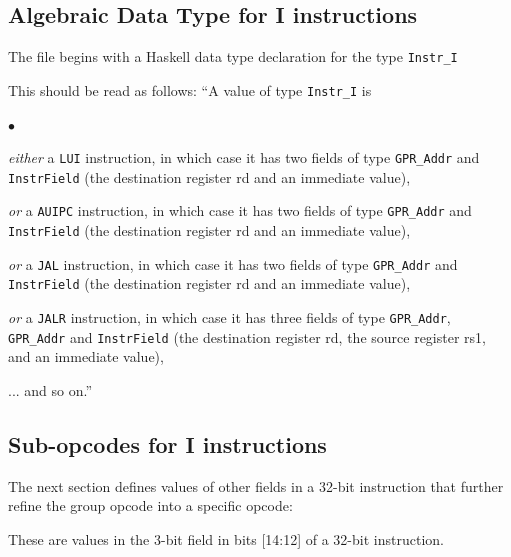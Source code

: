 \documentclass[11pt]{article}
\newenvironment{tightlist}%
{\begin{list}{$\bullet$}{%
    \setlength{\topsep}{0in}
    \setlength{\partopsep}{0in}
    \setlength{\itemsep}{0in}
    \setlength{\parsep}{0in}
    \setlength{\leftmargin}{1.5em}
    \setlength{\rightmargin}{0in}
    \setlength{\itemindent}{0in}
}
}%
{\end{list}
}
\begin{document}

\subsection{Algebraic Data Type for I instructions}

The file begins with a Haskell data type declaration for the type
\verb|Instr_I|



This should be read as follows: ``A value of type \verb|Instr_I| is
\begin{tightlist}

\item \emph{either} a \verb|LUI| instruction, in which case it has two
fields of type \verb|GPR_Addr| and
\verb|InstrField| (the destination register rd and an immediate value),

\item \emph{or} a \verb|AUIPC| instruction, in which case it has two
fields of type \verb|GPR_Addr| and \verb|InstrField| (the destination
register rd and an immediate value),

\item \emph{or} a \verb|JAL| instruction, in which case it has two
fields of type \verb|GPR_Addr| and \verb|InstrField| (the destination
register rd and an immediate value),

\item \emph{or} a \verb|JALR| instruction, in which case it has three
fields of type \verb|GPR_Addr|, \verb|GPR_Addr| and \verb|InstrField|
(the destination register rd, the source register rs1, and an
immediate value),

\item ... and so on.''

\end{tightlist}


\subsection{Sub-opcodes for I instructions}

The next section defines values of other fields in a 32-bit
instruction that further refine the group opcode into a specific
opcode:



These are values in the 3-bit field in bits [14:12] of a 32-bit instruction.
\end{document}
